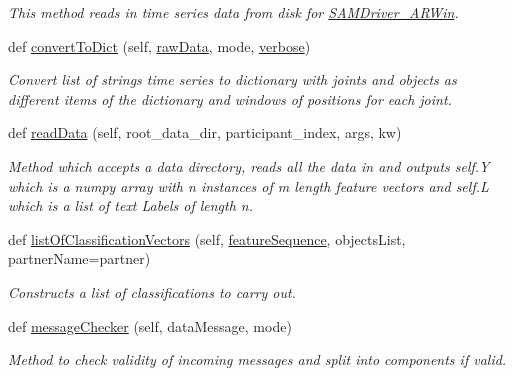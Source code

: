 \begin{DoxyCompactItemize}
\begin{DoxyCompactList}\small\item\em This method reads in time series data from disk for \hyperlink{group__icubclient__SAM__Drivers_classSAM_1_1SAM__Drivers_1_1SAMDriver__ARWin_1_1SAMDriver__ARWin}{S\+A\+M\+Driver\+\_\+\+A\+R\+Win}. \end{DoxyCompactList}\item 
def \hyperlink{group__icubclient__SAM__Drivers_adf0a2c86e4fb05deaee70ffbd212db57}{convert\+To\+Dict} (self, \hyperlink{group__icubclient__SAM__Drivers_ga7e5bd4edc32a108d5641cf7343887b6c}{raw\+Data}, mode, \hyperlink{group__icubclient__SAM__Drivers_ga48cfefc6532ba606936b9fd7f3156da8}{verbose})
\begin{DoxyCompactList}\small\item\em Convert list of strings time series to dictionary with joints and objects as different items of the dictionary and windows of positions for each joint. \end{DoxyCompactList}\item 
def \hyperlink{group__icubclient__SAM__Drivers_afc5f853cfede70ba59eadee2277a9e6c}{read\+Data} (self, root\+\_\+data\+\_\+dir, participant\+\_\+index, args, kw)
\begin{DoxyCompactList}\small\item\em Method which accepts a data directory, reads all the data in and outputs self.\+Y which is a numpy array with n instances of m length feature vectors and self.\+L which is a list of text Labels of length n. \end{DoxyCompactList}\item 
def \hyperlink{group__icubclient__SAM__Drivers_ac06888bfa96e2317bd325af608fcf463}{list\+Of\+Classification\+Vectors} (self, \hyperlink{group__icubclient__SAM__Drivers_accf604f68241cf3847a9f5d695710330}{feature\+Sequence}, objects\+List, partner\+Name=\textquotesingle{}partner\textquotesingle{})
\begin{DoxyCompactList}\small\item\em Constructs a list of classifications to carry out. \end{DoxyCompactList}\item 
def \hyperlink{group__icubclient__SAM__Drivers_a3efad08324380997a894dd960a302bc2}{message\+Checker} (self, data\+Message, mode)
\begin{DoxyCompactList}\small\item\em Method to check validity of incoming messages and split into components if valid. \end{DoxyCompactList}\item 

\end{DoxyCompactItemize}
